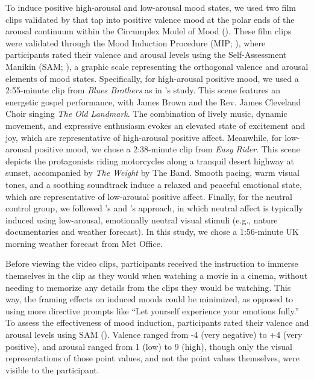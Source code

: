 \documentclass[../MA_Thesis.tex]{subfiles}
\begin{document}
To induce positive high-arousal and low-arousal mood states, we used two film clips validated by \textcite{wensveen_push_2002} that tap into positive valence mood at the polar ends of the arousal continuum within the Circumplex Model of Mood (\cite{feldman_variations_1995}). These film clips were validated through the Mood Induction Procedure (MIP; \cite{lench_discrete_2011}), where participants rated their valence and arousal levels using the Self-Assessment Manikin (SAM; \cite{bradley_affect_1999}), a graphic scale representing the orthogonal valence and arousal elements of mood states. Specifically, for high-arousal positive mood, we used a 2:55-minute clip from \textit{Blues Brothers} as in \cite{wensveen_push_2002}'s study. This scene features an energetic gospel performance, with James Brown and the Rev. James Cleveland Choir singing \textit{The Old Landmark}. The combination of lively music, dynamic movement, and expressive enthusiasm evokes an elevated state of excitement and joy, which are representative of high-arousal positive affect. Meanwhile, for low-arousal positive mood, we chose a 2:38-minute clip from \textit{Easy Rider}. This scene depicts the protagonists riding motorcycles along a tranquil desert highway at sunset, accompanied by \textit{The Weight} by The Band. Smooth pacing, warm visual tones, and a soothing soundtrack induce a relaxed and peaceful emotional state, which are representative of low-arousal positive affect. Finally, for the neutral control group, we followed \textcite{maryam_fakhrhosseini_affectemotion_2017}'s and \textcite{siedlecka_experimental_2019}'s approach, in which neutral affect is typically induced using low-arousal, emotionally neutral visual stimuli (e.g., nature documentaries and weather forecast). In this study, we chose a 1:56-minute UK morning weather forecast from Met Office. 

Before viewing the video clips, participants received the instruction to immerse themselves in the clip as they would when watching a movie in a cinema, without needing to memorize any details from the clips they would be watching. This way, the framing effects on induced moods could be minimized, as opposed to using more directive prompts like ``Let yourself experience your emotions fully.'' To assess the effectiveness of mood induction, participants rated their valence and arousal levels using SAM (\cite{bradley_affect_1999}). Valence ranged from -4 (very negative) to +4 (very positive), and arousal ranged from 1 (low) to 9 (high), though only the visual representations of those point values, and not the point values themselves, were visible to the participant. 
\end{document}

